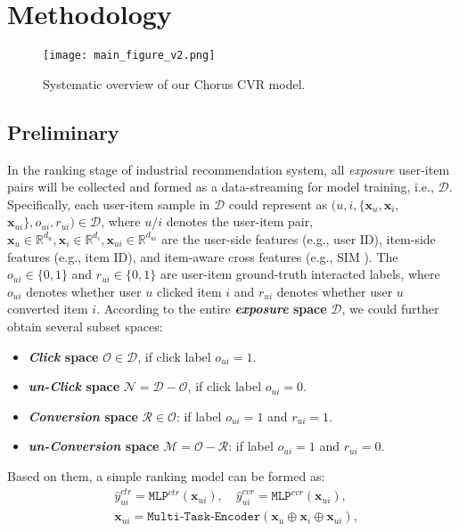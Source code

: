 \section{Methodology}


\begin{figure*}[t]
  \centering
\texttt{[image: main\_figure\_v2.png]}
  \vspace{-1em}
  \caption{Systematic overview of our Chorus CVR model.}
  \label{choruscvr}
  \vspace{-1em}
\end{figure*}


\subsection{Preliminary}
In the ranking stage of industrial recommendation system, all \textit{exposure} user-item pairs will be collected and formed as a data-streaming for model training, i.e., $\mathcal{D}$.
Specifically, each user-item sample in $\mathcal{D}$ could represent as $(u, i, \{\mathbf{x}_u, \mathbf{x}_i,$ $\mathbf{x}_{ui}\}, o_{ui}, r_{ui}) \in \mathcal{D}$, where $u$/$i$ denotes the user-item pair, $\mathbf{x}_u\in\mathbb{R}^{d_u}, \mathbf{x}_i\in\mathbb{R}^{d_i}, \mathbf{x}_{ui}\in\mathbb{R}^{d_{ui}}$ are the user-side features (e.g., user ID), item-side features (e.g., item ID), and item-aware cross features (e.g., SIM \cite{sim}).
%
The $o_{ui}\in\{0,1\}$ and $r_{ui}\in\{0,1\}$ are user-item ground-truth interacted labels, where $o_{ui}$ denotes whether user $u$ clicked item $i$ and $r_{ui}$ denotes whether user $u$ converted item $i$. 
%
According to the entire \textbf{\textit{exposure} space} $\mathcal{D}$, we could further obtain several subset spaces:
%
\begin{itemize}[leftmargin=*,align=left]
\item \textbf{\textit{Click} space} $\mathcal{O}\in\mathcal{D}$, if click label $o_{ui} = 1$.
\item \textbf{\textit{un-Click} space} $\mathcal{N}=\mathcal{D} - \mathcal{O}$, if click label $o_{ui} = 0$.
\item \textbf{\textit{Conversion} space} $\mathcal{R}\in\mathcal{O}$: if label $o_{ui}=1$ and $r_{ui}=1$.
\item \textbf{\textit{un-Conversion} space} $\mathcal{M}=\mathcal{O}-\mathcal{R}$: if label $o_{ui}=1$ and $r_{ui}=0$.
\end{itemize}
%
Based on them, a simple ranking model can be formed as:
\begin{equation}
\begin{split}
&\hat{y}^{ctr}_{ui} = \texttt{MLP}^{ctr}(\mathbf{x}_{ui}),\quad \hat{y}^{cvr}_{ui} = \texttt{MLP}^{cvr}(\mathbf{x}_{ui}),\\
&\mathbf{x}_{ui} = \texttt{Multi-Task-Encoder}(\mathbf{x}_u\oplus \mathbf{x}_i\oplus \mathbf{x}_{ui}),\\
\end{split}
\label{base}
\end{equation}
